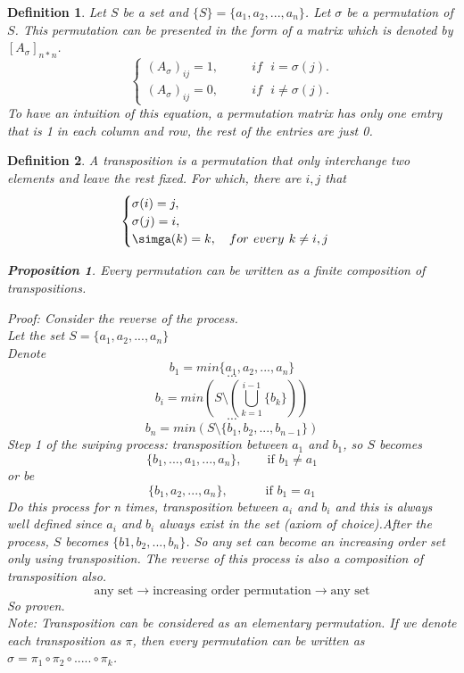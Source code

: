 \documentclass[12pt,letterpaper]{article}
\newtheorem{mydef}{Definition}
\newtheorem{prop}{Proposition}
\begin{document}
\begin{mydef}\label{def:def444}
Let $S$ be a set and $\{S\}=\{a_1,a_2,...,a_n\}$. Let $\sigma$ be a permutation of $S$. This permutation can be presented in the form of a matrix which is denoted by $[A_\sigma]_{n*n}$.
\begin{equation}
 \begin{cases}
 (A_\sigma)_{ij}=1,\textbf{     } \textbf{  }\textbf{  }\textbf{  }if \textbf{  }i=\sigma(j). \\
 (A_\sigma)_{ij}=0,\textbf{     } \textbf{  }\textbf{  }\textbf{  } if\textbf{  } i\neq \sigma(j).
 \end{cases} 
\end{equation}
To have an intuition of this equation, a permutation matrix has only one emtry that is 1 in each column and row, the rest of the entries are just 0.
\end{mydef}
\begin{mydef}\label{def:def444}
A transposition is a permutation that only interchange two elements and leave the rest fixed. For which, there are $i,j$ that
\begin{equation}
 \begin{cases}
 \sigma(i)=j, \\
 \sigma(j)=i, \\
 \simga(k)=k, \hspace{1em} for \textbf{ } every  \textbf{ } k \neq i,j 
 \end{cases} 
\end{equation}

\begin{prop}
Every permutation can be written as a finite composition of transpositions. 
\end{prop}
Proof: Consider the reverse of the process. \\
Let the set $S=\{a_1,a_2,...,a_n\}$ \\
Denote  $$b_1=min\{a_1,a_2,...,a_n\}$$
$$\cdots$$
$$b_i=min(S\setminus(\bigcup_{k=1}^{i-1}\{b_k\}))$$
$$\cdots$$
$$b_n=min(S\setminus\{b_1,b_2,...,b_{n-1}\})$$
Step 1 of the swiping process: transposition between $a_1$ and $b_1$, so $S$ becomes $$\{b_1,...,a_1,...,a_n\}, \hspace{2em} \text{if } b_1 \neq a_1$$
or be $$\{b_1,a_2,...,a_n\}, \hspace{3em} \text{if } b_1 = a_1$$
Do this process for n times, transposition between $a_i$ and $b_i$ and this is always well defined since $a_i$ and $b_i$ always exist in the set (axiom of choice).After the process, $S$ becomes $\{b1,b_2,...,b_n\}$. So any set can become an increasing order set only using transposition. The reverse of this process is also a composition of transposition also.\\
$$\text{any set} \longrightarrow \text{increasing order permutation} 
\longrightarrow \text{any set}$$
So proven.\\
Note: Transposition can be considered as an elementary permutation. If we denote each transposition as $\pi$, then every permutation can be written as $\sigma =\pi_1 \circ \pi_2 \circ ..... \circ \pi_k$. 
\end{mydef}
\end{document}
